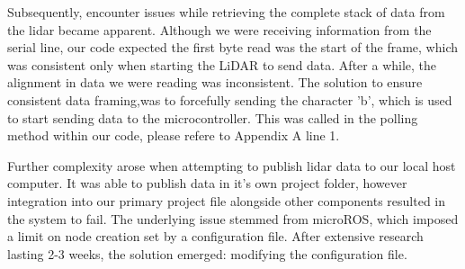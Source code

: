 \documentclass[conference]{IEEEtran}
\begin{document}
Subsequently, encounter issues while retrieving the complete stack of data from the lidar became apparent. Although we were receiving information from the serial line, our code expected the first byte read was the start of the frame, which was consistent only when starting the LiDAR to send data. After a while, the alignment in data we were reading was inconsistent. The solution to ensure consistent data framing,was to forcefully sending the character 'b', which is used to start sending data to the microcontroller. This was called in the polling method within our code, please refere to Appendix A line 1.

Further complexity arose when attempting to publish lidar data to our local host computer. It was able to publish data in it’s own project folder, however integration into our primary project file alongside other components resulted in the system to fail. The underlying issue stemmed from microROS, which imposed a limit on node creation set by a configuration file. After extensive research lasting 2-3 weeks, the solution emerged: modifying the configuration file.

\clearpage
\end{document}
